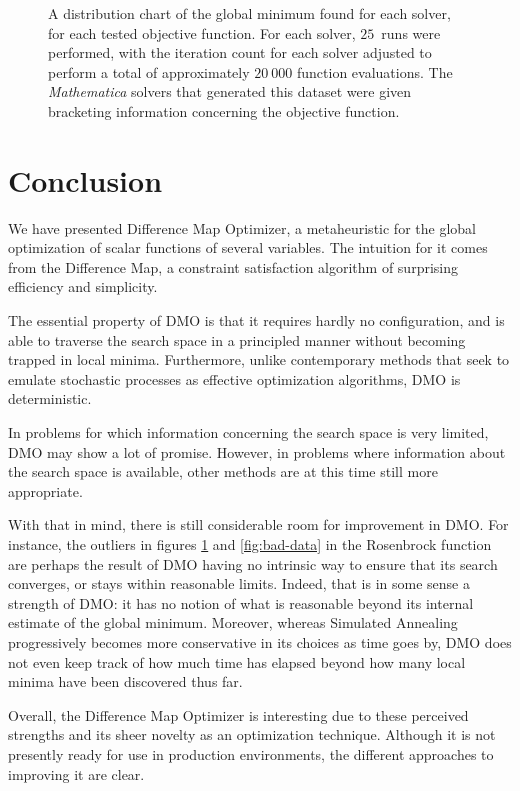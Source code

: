 \documentclass[12pt]{article}
\begin{document}
\begin{figure}[H]
\begin{center}
        \caption{
            A distribution chart of the global minimum found for each
            solver, for each tested objective function. For each solver,
            $25$~runs were performed, with the iteration count for each
            solver adjusted to perform a total of approximately $20~000$
            function evaluations. The \emph{Mathematica} solvers that
            generated this dataset were given bracketing information
            concerning the objective function.
        }
        \label{fig:good-data}
    \end{center}
\end{figure}

\pagebreak

\section{Conclusion}

We have presented Difference Map Optimizer, a metaheuristic for the global
optimization of scalar functions of several variables.
The intuition for it comes from the Difference Map, a constraint satisfaction
algorithm of surprising efficiency and simplicity.

The essential property of DMO is that it requires hardly no configuration, and
is able to traverse the search space in a principled manner without becoming
trapped in local minima.
Furthermore, unlike contemporary methods that seek to emulate stochastic
processes as effective optimization algorithms, DMO is deterministic.

In problems for which information concerning the search space is very limited,
DMO may show a lot of promise.
However, in problems where information about the search space is available,
other methods are at this time still more appropriate.

With that in mind, there is still considerable room for improvement in DMO. For
instance, the outliers in figures \ref{fig:good-data} and \ref{fig:bad-data} in
the Rosenbrock function are perhaps the result of DMO having no intrinsic way
to ensure that its search converges, or stays within reasonable limits. Indeed,
that is in some sense a strength of DMO: it has no notion of what is reasonable
beyond its internal estimate of the global minimum. Moreover, whereas Simulated
Annealing progressively becomes more conservative in its choices as time goes
by, DMO does not even keep track of how much time has elapsed beyond how many
local minima have been discovered thus far.

Overall, the Difference Map Optimizer is interesting due to these perceived
strengths and its sheer novelty as an optimization technique. Although it is
not presently ready for use in production environments, the different
approaches to improving it are clear.

\pagebreak



\end{document}
